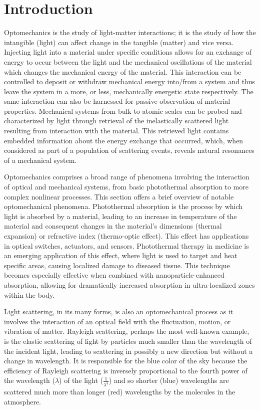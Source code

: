 \chapter{Introduction}
\label{ch:Introduction}
\acresetall

Optomechanics is the study of light-matter interactions; it is the study of how the intangible (light) can affect change in the tangible (matter) and vice versa. Injecting light into a material under specific conditions allows for an exchange of energy to occur between the light and the mechanical oscillations of the material which changes the mechanical energy of the material. This interaction can be controlled to deposit or withdraw mechanical energy into/from a system and thus leave the system in a more, or less, mechanically energetic state respectively. The same interaction can also be harnessed for passive observation of material properties. Mechanical systems from bulk to atomic scales can be probed and characterized by light through retrieval of the inelastically scattered light resulting from interaction with the material. This retrieved light contains embedded information about the energy exchange that occurred, which, when considered as part of a population of scattering events, reveals natural resonances of a mechanical system.

Optomechanics comprises a broad range of phenomena involving the interaction of optical and mechanical systems, from basic photothermal absorption to more complex nonlinear processes. This section offers a brief overview of notable optomechanical phenomena. Photothermal absorption is the process by which light is absorbed by a material, leading to an increase in temperature of the material and consequent changes in the material's dimensions (thermal expansion) or refractive index (thermo-optic effect). This effect has applications in optical switches, actuators, and sensors. \cite{boccara1980thermo, sutar2024design} Photothermal therapy in medicine is an emerging application of this effect, where light is used to target and heat specific areas, causing localized damage to diseased tissue\cite{hirsch2003nanoshell}. This technique becomes especially effective when combined with nanoparticle-enhanced absorption, allowing for dramatically increased absorption in ultra-localized zones within the body. \cite{johnson2018hybridization}

Light scattering, in its many forms, is also an optomechanical process as it involves the interaction of an optical field with the fluctuation, motion, or vibration of matter. Rayleigh scattering, perhaps the most well-known example, is the elastic scattering of light by particles much smaller than the wavelength of the incident light, leading to scattering in possibly a new direction but without a change in wavelength. It is responsible for the blue color of the sky because the efficiency of Rayleigh scattering is inversely proportional to the fourth power of the wavelength (\(\lambda\)) of the light (\(\frac{1}{\lambda^{4}}\)) and so shorter (blue) wavelengths are scattered much more than longer (red) wavelengths by the molecules in the atmosphere.\cite{rayleigh1871light}

